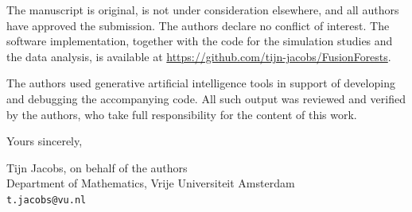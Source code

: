 \documentclass[11pt]{article}
\begin{document}
The manuscript is original, is not under consideration elsewhere, and all
authors have approved the submission. The authors declare no conflict of
interest. The software implementation, together with the code for the
simulation studies and the data analysis, is available at
\url{https://github.com/tijn-jacobs/FusionForests}.

The authors used generative artificial intelligence tools in support of
developing and debugging the accompanying code. All such output was reviewed and
verified by the authors, who take full responsibility for the content of this
work.

\medskip

Yours sincerely,

\medskip

Tijn Jacobs, on behalf of the authors \\
Department of Mathematics, Vrije Universiteit Amsterdam \\
\texttt{t.jacobs@vu.nl}
\end{document}
